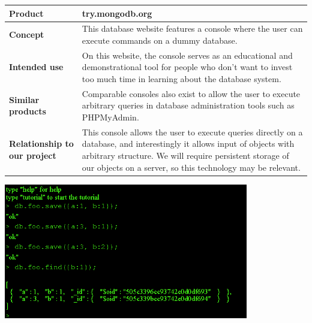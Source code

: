 \begin{center}
\begin{tabularx}{\textwidth}{ l X }
\hline
\textbf{Product} & try.mongodb.org \\ \hline
\textbf{Concept} & This database website features a console where the user can execute commands on a dummy database. \\ \hline
\textbf{Intended use} & On this website, the console serves as an educational and demonstrational tool for people who don't want to invest too much time in learning about the database system. \\ \hline
\textbf{Similar products} & Comparable consoles also exist to allow the user to execute arbitrary queries in database administration tools such as PHPMyAdmin. \\ \hline
\textbf{Relationship to our project} & This console allows the user to execute queries directly on a database, and interestingly it allows input of objects with arbitrary structure. We will require persistent storage of our objects on a server, so this technology may be relevant. \\ \hline
\end{tabularx}
\label{tab:mongodbc}
\end{center}

\begin{center}
\includegraphics[width = 0.8\textwidth]{image/mongodb.png}
\label{mongodbcimage}%
\end{center}


